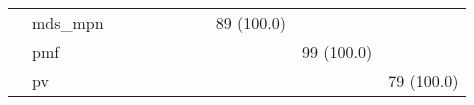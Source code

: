 \begin{tabular}{lllllllllll}
                 & mds\_mpn &                      &                     &                    &                      &                     &                   &        89 (100.0) &                     &                      \\
                 & pmf &                      &                     &                    &                      &                     &                   &                   &          99 (100.0) &                      \\
                 & pv &                      &                     &                    &                      &                     &                   &                   &                     &           79 (100.0) \\
\bottomrule
\end{tabular}
